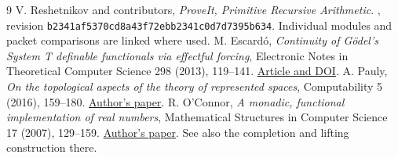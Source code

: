 \begin{thebibliography}{9}
 V. Reshetnikov and contributors, \emph{ProveIt, Primitive Recursive Arithmetic}. , revision \texttt{b2341af5370cd8a43f72ebb2341c0d7d7395b634}. Individual modules and packet comparisons are linked where used.
 M. Escard\'o, \emph{Continuity of G\"odel's System T definable functionals via effectful forcing}, Electronic Notes in Theoretical Computer Science 298 (2013), 119--141. \href{https://doi.org/10.1016/j.entcs.2013.09.010}{Article and DOI}.
 A. Pauly, \emph{On the topological aspects of the theory of represented spaces}, Computability 5 (2016), 159--180. \href{https://arxiv.org/abs/1204.3763}{Author's paper}.
 R. O'Connor, \emph{A monadic, functional implementation of real numbers}, Mathematical Structures in Computer Science 17 (2007), 129--159. \href{https://arxiv.org/abs/cs/0605058}{Author's paper}. See also the completion and lifting construction there.
\end{thebibliography}
